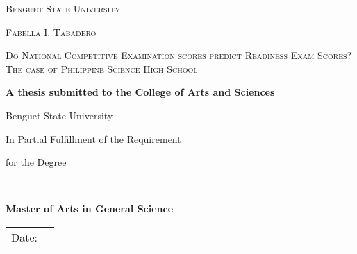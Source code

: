 \begin{titlepage}
	\centering
	{\scshape\LARGE Benguet State University \par}
	\vspace{1cm}
	{\scshape\Large Fabella I. Tabadero\par}
	\vspace{2.5cm}
	{\scshape\Large Do National Competitive Examination scores predict Readiness Exam Scores? The case of Philippine Science High School\par}
	\vspace{2.5cm}
	{\bfseries A thesis submitted to the College of Arts and Sciences\par 
	Benguet State University\par
	In Partial Fulfillment of the Requirement\par
	for the Degree}\\
	\vspace{2.5cm}
	{\bfseries Master of Arts in General Science\par}
	\vspace{2.5cm}


	\vfill

	{\large \begin{tabular}{lp{1in}}
	Date: & \\ \cline{2-2}
	\end{tabular}\par}
\end{titlepage}

